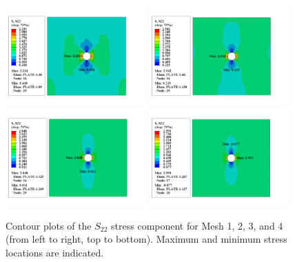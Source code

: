 \documentclass[12pt]{article}
\begin{document}
\begin{figure}[H]
    \centering
    \includegraphics[width=0.48\textwidth]{images/S22_Mesh1.png}
    \includegraphics[width=0.48\textwidth]{images/S22_Mesh2.png}\\[-1.1em]
    \includegraphics[width=0.48\textwidth]{images/S22_Mesh3.png}
    \includegraphics[width=0.48\textwidth]{images/S22_Mesh4.png}
    \caption{Contour plots of the $S_{22}$ stress component for Mesh 1, 2, 3, and 4 (from left to right, top to bottom). Maximum and minimum stress locations are indicated.}
    \end{figure}
\end{document}
